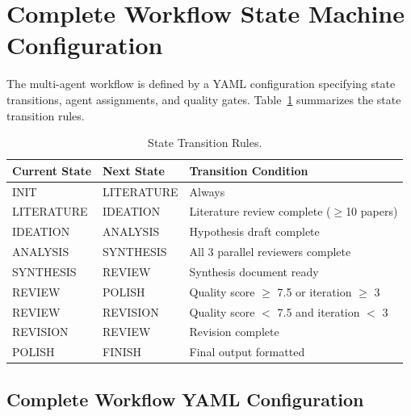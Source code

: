\section{Complete Workflow State Machine Configuration}
\label{app:workflow_config}

The multi-agent workflow is defined by a YAML configuration specifying state transitions, agent assignments, and quality gates. Table~\ref{tab:state_transitions} summarizes the state transition rules.

\begin{table}[h]
\centering
\small
\begin{tabular}{llp{6cm}}
\toprule
\textbf{Current State} & \textbf{Next State} & \textbf{Transition Condition} \\
\midrule
INIT & LITERATURE & Always \\
LITERATURE & IDEATION & Literature review complete ($\geq$10 papers) \\
IDEATION & ANALYSIS & Hypothesis draft complete \\
ANALYSIS & SYNTHESIS & All 3 parallel reviewers complete \\
SYNTHESIS & REVIEW & Synthesis document ready \\
REVIEW & POLISH & Quality score $\geq$ 7.5 or iteration $\geq$ 3 \\
REVIEW & REVISION & Quality score $<$ 7.5 and iteration $<$ 3 \\
REVISION & REVIEW & Revision complete \\
POLISH & FINISH & Final output formatted \\
\bottomrule
\end{tabular}
\caption{State Transition Rules.}
\label{tab:state_transitions}
\end{table}

\subsection{Complete Workflow YAML Configuration}

